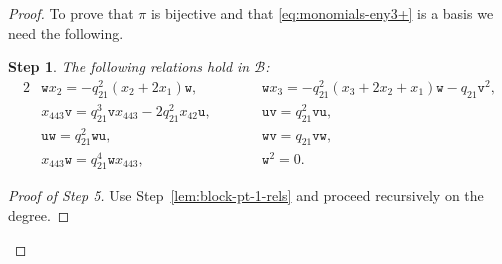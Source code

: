 \documentclass[pdftex]{sigma}
\numberwithin{equation}{section}
\newtheorem{step}{Step}
\newcommand{\toba}{\mathscr B}
\newcommand{\ut}{\mathtt{u}}
\newcommand{\vt}{\mathtt{v}}
\newcommand{\wt}{\mathtt{w}}
\begin{document}
\begin{proof}
To prove that $\pi$ is bijective and that \eqref{eq:monomials-eny3+} is a basis we need the following.

\begin{step}\label{lem:block3-pt-1-relations-2}
The following relations hold in $\toba$:
\begin{alignat*}{2}
&\wt x_2 = -q_{21}^2(x_2+2x_1)\wt, &&\wt x_3 = -q_{21}^2(x_3+2x_2+x_1)\wt-q_{21}\vt^2,
\\
&x_{443}\vt = q_{21}^3\vt x_{443}-2q_{21}^2x_{42}\ut,\qquad &&\ut\vt = q_{21}^2\vt\ut,
\\
&\ut \wt = q_{21}^2 \wt \ut, &&\wt \vt = q_{21} \vt \wt,
\\
&x_{443} \wt = q_{21}^4 \wt x_{443}, &&\wt^2=0.
\end{alignat*}
\end{step}

\begin{proof}[Proof of Step 5]
Use Step~\ref{lem:block-pt-1-rels} and proceed recursively on the degree.
\end{proof}


\end{proof}
\end{document}
